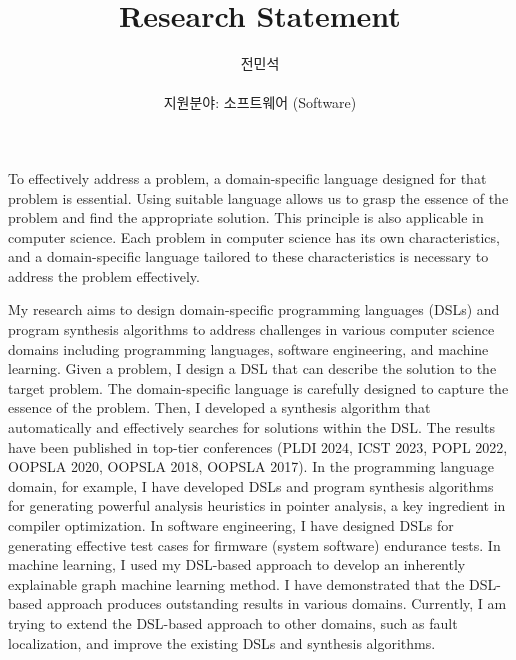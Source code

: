 \documentclass[11pt]{article}
\begin{document}
\title{Research Statement}

\author{전민석\\\\지원분야: 소프트웨어 (Software)}



\newcommand{\DisjunctiveModel}{\textsc{Disjunctive Model}}
\newcommand{\FeatureLanguage}{\textsc{Feature Language}}
\newcommand{\GDL}{\textsc{Graph Description Language}}
\newcommand{\PLXGL}{\textsc{PL4XGL}}


\newcommand{\AbstractRelativeWritePattern}{\textsc{Abstract Relative Write Pattern}}

\maketitle 


To effectively address a problem, a domain-specific language designed for that problem is essential. 
%
Using suitable language allows us to grasp the essence of the problem and find the appropriate solution. 
%
This principle is also applicable in computer science.
%
Each problem in computer science has its own characteristics, and a domain-specific language tailored to these characteristics is necessary to address the problem effectively.




My research aims to design domain-specific programming languages (DSLs) and program synthesis algorithms to address challenges in various computer science domains including programming languages, software engineering, and machine learning.
%
Given a problem, I design a DSL that can describe the solution to the target problem.
%
The domain-specific language is carefully designed to capture the essence of the problem.
%
Then, I developed a synthesis algorithm that automatically and effectively searches for solutions within the DSL.
%
The results have been published in top-tier conferences (PLDI 2024, ICST 2023, POPL 2022, OOPSLA 2020, OOPSLA 2018, OOPSLA 2017).
%
In the programming language domain, for example, I have developed DSLs and program synthesis algorithms for generating powerful analysis heuristics in pointer analysis, a key ingredient in compiler optimization.
%
In software engineering, I have designed DSLs for generating effective test cases for firmware (system software) endurance tests. 
%
In machine learning, I used my DSL-based approach to develop an inherently explainable graph machine learning method.
%
I have demonstrated that the DSL-based approach produces outstanding results in various domains.
%
Currently, I am trying to extend the DSL-based approach to other domains, such as fault localization, and improve the existing DSLs and synthesis algorithms.
\end{document}

